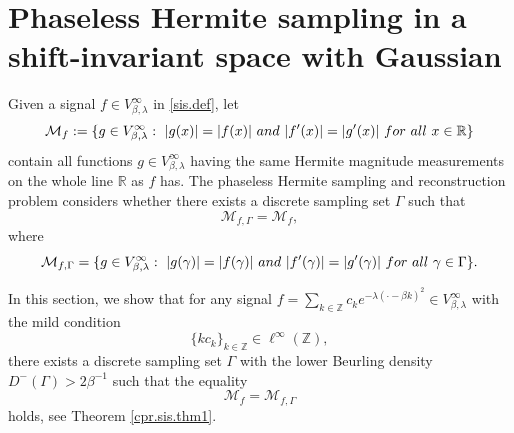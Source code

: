 \documentclass[11pt,oneside,reqno]{amsart}
\numberwithin{equation}{section}
\def\R{ {\mathbb R} }
\def\Z{ {\mathbb Z} }
\def\Vbeta{V^\infty_{\beta,\lambda}}
\begin{document}
\medskip


\section{Phaseless Hermite sampling in a shift-invariant space with Gaussian }\label{phaseless.sec}
\medskip

Given a signal  $f\in \Vbeta$ in \eqref{sis.def},  let
\begin{equation}\label{mf.def}
{\mathcal M}_{f}:=\{g\in \Vbeta: \   |g(x)|=|f(x)| {\rm\ and}\  |f'(x)|=|g'(x)| \ {\rm for \ all} \  x\in\R\}
\end{equation}
contain all functions $g\in  \Vbeta$ having the same Hermite magnitude measurements on the whole line  $\R$ as $f$ has. The phaseless Hermite sampling and reconstruction problem considers whether there exists a discrete sampling set $\Gamma$ such that
 \begin{equation*}\label{cpr.equal.def}
 {\mathcal M}_{f,\Gamma}=  {\mathcal M}_{f},
 \end{equation*}
where
\begin{equation}\label{mf.gamma.def}{\mathcal M}_{f,\Gamma}=\{g\in \Vbeta: \   |g(\gamma)|=|f(\gamma)| {\rm\ and}\  |f'(\gamma)|=|g'(\gamma)| \ {\rm for \ all} \  \gamma\in \Gamma\}.
\end{equation}


In this section, we show that for  any signal $f=\sum_{k\in \Z} c_ke^{-\lambda(\cdot-\beta k)^2}\in \Vbeta$   with the mild condition
\begin{equation}\label{signal.assump}
\{kc_k\}_{k\in \Z} \in \ell^\infty(\Z),
\end{equation}
 there exists a discrete sampling set $\Gamma$ with the lower Beurling density $D^-(\Gamma)>2\beta^{-1}$ such that the equality
 $${\mathcal M}_{f} =  {\mathcal M}_{f,\Gamma}$$ holds,  see  Theorem \ref{cpr.sis.thm1}.
\end{document}
